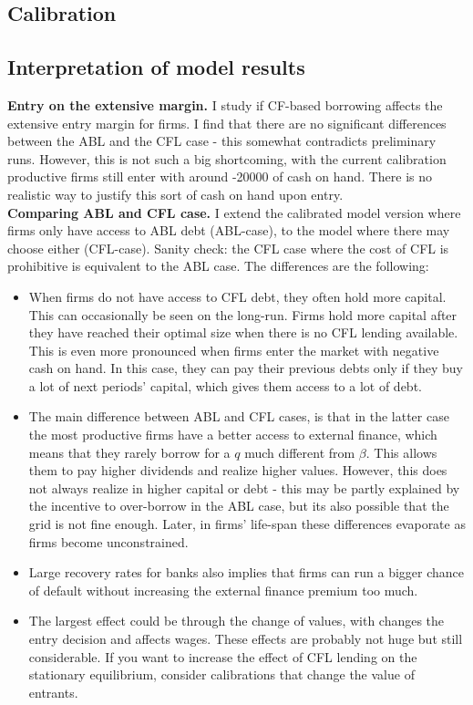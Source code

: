 \documentclass[12pt]{article}
\begin{document}
\subsection*{Calibration}



\newpage

\subsection*{Interpretation of model results}
\textbf{Entry on the extensive margin.} I study if CF-based borrowing affects the extensive entry margin for firms. I find that there are no significant differences between the ABL and the CFL case - this somewhat contradicts preliminary runs. However, this is not such a big shortcoming, with the current calibration productive firms still enter with around -20000 of cash on hand. There is no realistic way to justify this sort of cash on hand upon entry. \vspace{3mm} \\
\textbf{Comparing ABL and CFL case.} I extend the calibrated model version where firms only have access to ABL debt (ABL-case), to the model where there may choose either (CFL-case). Sanity check: the CFL case where the cost of CFL is prohibitive is equivalent to the ABL case. The differences are the following: 
\begin{itemize}\setlength\itemsep{0em} \small
    \item When firms do not have access to CFL debt, they often hold more capital. This can occasionally be seen on the long-run. Firms hold more capital after they have reached their optimal size when there is no CFL lending available. This is even more pronounced when firms enter the market with negative cash on hand. In this case, they can pay their previous debts only if they buy a lot of next periods' capital, which gives them access to a lot of debt.
    \item The main difference between ABL and CFL cases, is that in the latter case the most productive firms have a better access to external finance, which means that they rarely borrow for a $q$ much different from $\beta$. This allows them to pay higher dividends and realize higher values. However, this does not always realize in higher capital or debt - this may be partly explained by the incentive to over-borrow in the ABL case, but its also possible that the grid is not fine enough. Later, in firms' life-span these differences evaporate as firms become unconstrained.
    \item Large recovery rates for banks also implies that firms can run a bigger chance of default without increasing the external finance premium too much.
    \item The largest effect could be through the change of values, with changes the entry decision and affects wages. These effects are probably not huge but still considerable. If you want to increase the effect of CFL lending on the stationary equilibrium, consider calibrations that change the value of entrants.
\end{itemize} \normalsize
\end{document}
